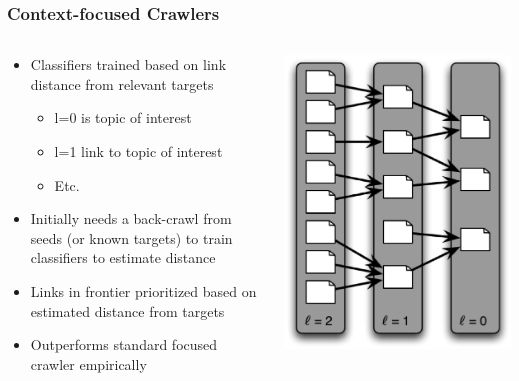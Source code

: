 \documentclass{beamer}
\begin{document}
\begin{frame} \frametitle{Context-focused Crawlers}


\begin{columns}

\begin{column}{0.6\textwidth}

\begin{itemize}
\item Classifiers trained based on link distance from relevant targets
\begin{itemize}
\item l=0 is topic of interest
\item l=1 link to topic of interest
\item Etc.
\end{itemize}

\item Initially needs a back-crawl from seeds (or known targets) to train classifiers to estimate distance
\item Links in frontier prioritized based on estimated distance from targets
\item Outperforms standard focused crawler empirically
\end{itemize}

\end{column}
\begin{column}{0.4\textwidth}

\begin{center}
     \includegraphics[width=.8\textwidth]{crawler-focused-context-graph}


\end{center}
\end{column}
\end{columns}
\end{frame}
\end{document}
